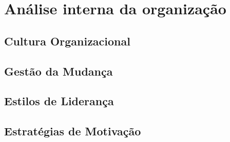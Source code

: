 \chapter{Análise interna da organização}
\label{Chapter2} %

\section{Cultura Organizacional}
\section{Gestão da Mudança}
\section{Estilos de Liderança}
\section{Estratégias de Motivação}